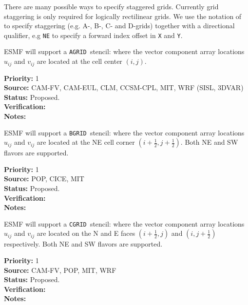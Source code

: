 
There are many possible ways to specify staggered grids.  Currently
grid staggering is only required for logically rectilinear grids. We
use the notation of \cite{ref:a1966} to specify staggering (e.g. A-,
B-, C- and D-grids) together with a directional qualifier, e.g
\texttt{NE} to specify a forward index offset in \texttt{X} and
\texttt{Y}.

\newcommand{\agrid}{\texttt{AGRID~}}
\newcommand{\bgrid}{\texttt{BGRID~}}
\newcommand{\cgrid}{\texttt{CGRID~}}
\newcommand{\dgrid}{\texttt{DGRID~}}
\newcommand{\egrid}{\texttt{EGRID~}}

\sreq{\agrid}

ESMF will support a \agrid stencil: where the vector
component array locations $u_{ij}$ and $v_{ij}$ are located at the
cell center $(i,j)$.

\begin{reqlist}
{\bf Priority:} 1\\ 
{\bf Source:} CAM-FV, CAM-EUL, CLM, CCSM-CPL, MIT, WRF (SISL, 3DVAR) \\
{\bf Status:} Proposed. \\
{\bf Verification:} \\
{\bf Notes:}
\end{reqlist}

\sreq{\bgrid}

ESMF will support a \bgrid stencil: where the vector component array
locations $u_{ij}$ and $v_{ij}$ are located at the NE cell corner
$(i+\frac12,j+\frac12)$. Both NE and SW flavors are supported.

\begin{reqlist}
{\bf Priority:} 1\\ 
{\bf Source:} POP, CICE, MIT \\
{\bf Status:} Proposed. \\
{\bf Verification:} \\
{\bf Notes:}
\end{reqlist}

\sreq{\cgrid}

ESMF will support a \cgrid stencil: where the vector component array
locations $u_{ij}$ and $v_{ij}$ are located on the N and E faces
$(i+\frac12,j)$ and $(i,j+\frac12)$ respectively. Both NE and SW
flavors are supported.

\begin{reqlist}
{\bf Priority:} 1 \\ 
{\bf Source:} CAM-FV, POP, MIT, WRF \\
{\bf Status:} Proposed. \\
{\bf Verification:} \\
{\bf Notes:}
\end{reqlist}


